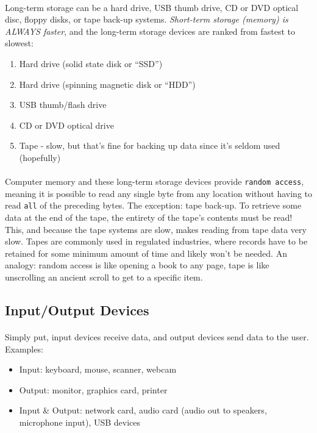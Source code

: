 \documentclass[letter,10pt]{article}
\begin{document}
\paragraph{}Long-term storage can be a hard drive, USB thumb drive, CD or DVD optical disc, floppy disks, or tape back-up systems. \textit{Short-term storage (memory) is ALWAYS faster}, and the long-term storage devices are ranked from fastest to slowest:
\begin{enumerate}
    \item Hard drive (solid state disk or ``SSD'')
    \item Hard drive (spinning magnetic disk or ``HDD'')
    \item USB thumb/flash drive
    \item CD or DVD optical drive
    \item Tape - slow, but that's fine for backing up data since it's seldom used (hopefully)
\end{enumerate}

\paragraph{}Computer memory and these long-term storage devices provide \texttt{random access}, meaning it is possible to read any single byte from any location without having to read \texttt{all} of the preceding bytes. The exception: tape back-up. To retrieve some data at the end of the tape, the entirety of the tape's contents must be read! This, and because the tape systems are slow, makes reading from tape data very slow. Tapes are commonly used in regulated industries, where records have to be retained for some minimum amount of time and likely won't be needed. An analogy: random access is like opening a book to any page, tape is like unscrolling an ancient scroll to get to a specific item.

\subsection{Input/Output Devices}
\paragraph{}Simply put, input devices receive data, and output devices send data to the user. Examples:
\begin{itemize}
    \item Input: keyboard, mouse, scanner, webcam
    \item Output: monitor, graphics card, printer
    \item Input \& Output: network card, audio card (audio out to speakers, microphone input), USB devices
\end{itemize}
\end{document}
